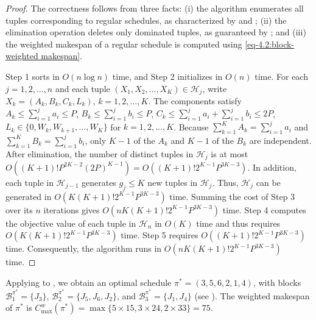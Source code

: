 \documentclass[12pt]{article} \textheight=24.5cm \textwidth=16.5cm \parskip = 0.165cm
\begin{document}
\begin{sloppypar}
        \begin{proof}
            The correctness follows from three facts: (i) the algorithm enumerates all tuples corresponding to regular schedules, as  characterized by  and ; (ii) the elimination operation deletes only dominated tuples, as guaranteed by ; and (iii) the weighted makespan of a regular schedule is computed using \cref{eq-4.2:block-weighted makespan}.
            
            Step 1 sorts in $O(n\log n)$ time, and Step 2 initializes in $O(n)$ time.
            For each $j=1, 2, \ldots, n$ and each tuple $(X_1, X_2, \ldots, X_K) \in \mathcal{H}_j$, write $X_k=(A_k, B_k, C_k, L_k)$, $k=1, 2, \ldots, K$.
            The components satisfy $A_k \leq \sum_{i=1}^{j} a_i \leq P$, $B_k \leq \sum_{i=1}^{j} b_i \leq P$, $C_k \leq \sum_{i=1}^{j} a_i +\sum_{i=1}^{j} b_i \leq 2P$, $L_k \in \{0, W_k, W_{k+1}, \ldots, W_K\}$ for $k=1, 2, \ldots, K$.
            Because $\sum_{k=1}^K A_k=\sum_{i=1}^j a_i$ and $\sum_{k=1}^K B_k=\sum_{i=1}^j b_i$, only $K-1$ of the $A_k$ and $K-1$ of the $B_k$ are independent.
            After elimination, the number of distinct tuples in $\mathcal{H}_j$ is at most $O((K+1)! P^{2K-2} (2P)^{K-1})=O((K+1)! 2^{K-1} P^{3K-3})$.
            In addition, each tuple in $\mathcal{H}_{j-1}$ generates $g_j \leq K$ new tuples in $\mathcal{H}_j$.
            Thus, $\mathcal{H}_j$ can be generated in $O(K(K+1)! 2^{K-1} P^{3K-3})$ time.
            Summing the cost of Step 3 over its $n$ iterations gives $O(n K (K+1)! 2^{K-1} P^{3K-3})$ time.
            Step 4 computes the objective value of each tuple in $\mathcal{H}_n$ in $O(K)$ time and thus requires $O(K (K+1)! 2^{K-1} P^{3K-3})$ time.
            Step 5 requires $O((K+1)! 2^{K-1} P^{3K-3})$ time.
            Consequently, the algorithm runs in $O(n K (K+1)! 2^{K-1} P^{3K-3})$ time.
        \end{proof}
        
        Applying  to , we obtain an optimal schedule $\pi^*=(3, 5, 6, 2, 1, 4)$, with blocks $\mathcal{B}_1^{\pi^*}=\{J_3\}$, $\mathcal{B}_2^{\pi^*}=\{J_5,J_6, J_2\}$, and $\mathcal{B}_3^{\pi^*}=\{J_1, J_4\}$ (see ).
        The weighted makespan of $\pi^*$ is $C_{\max}^w(\pi^*)=\max \{5 \times 15, 3 \times 24, 2 \times 33\}=75$.
        
        \begin{figure}[H]
            \centering
\end{figure}
\end{sloppypar}
\end{document}
